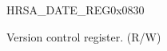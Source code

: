 \begin{register}{H}{RSA\_DATE\_REG}{0x{}0830}\label{regdesc:RSADATEREG}
%
%
\regnewline%
\begin{regdesc}\begin{reglist}
\item [RSA\_DATE] Version control register. (R/W)
\end{reglist}\end{regdesc}
\end{register}